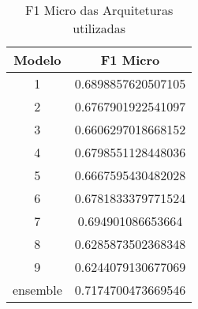 \begin{table}[!htb]
\centering
\caption{F1 Micro das Arquiteturas utilizadas}
\label{tbl:fscore}
\begin{tabular}{@{}cc@{}}
\toprule
Modelo & F1 Micro           \\ \midrule
1      & 0.6898857620507105 \\
2      & 0.6767901922541097 \\
3      & 0.6606297018668152 \\
4      & 0.6798551128448036 \\
5      & 0.6667595430482028 \\
6      & 0.6781833379771524 \\
7      & 0.694901086653664  \\
8      & 0.6285873502368348 \\
9      & 0.6244079130677069 \\ 
ensemble & 0.7174700473669546 \\ \bottomrule
\end{tabular}
\end{table}